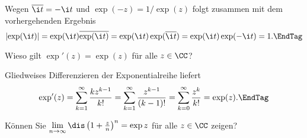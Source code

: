 \begin{antwort}
  Wegen $\overline{\i t}=-\i t$ und $\exp(-z)=1/\exp(z)$ 
  folgt zusammen mit dem vorhergehenden Ergebnis 
  \[
  \left|\exp(\i t)\right| = \exp(\i t)\overline{\exp(\i t)} = 
  \exp(\i t)\exp(\overline{\i t}) = 
  \exp(\i t)\exp(-\i t) = 1. \EndTag
  \]
\end{antwort} 

\begin{frage}
  Wieso gilt $\exp'(z)=\exp(z)$ für alle $z\in\CC$?
\end{frage}

\begin{antwort}
  Gliedweises Differenzieren der Exponentialreihe liefert
  \begin{equation}
    \exp'(z)=\sum_{k=1}^\infty \frac{kz^{k-1}}{k!} =
    \sum_{k=1}^\infty \frac{z^{k-1}}{(k-1)!}  =
    \sum_{k=0}^\infty \frac{z^k}{k!} = \exp(z).\EndTag
  \end{equation} 
\end{antwort}

\begin{frage}\label{05_exid} 
  Können Sie $\lim\limits_{n\to\infty}\dis\left( 1+\frac{z}{n}\right)^n = \exp z$ 
  für alle $z\in\CC$ zeigen?
\end{frage}

